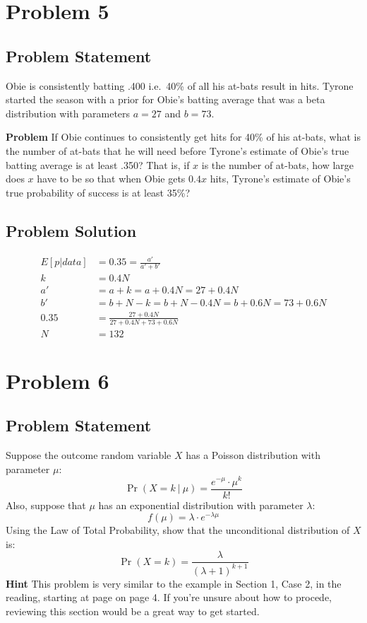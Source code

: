 \documentclass[12pt]{article}
\theoremstyle{definition}
\begin{document}
\newpage
\section*{Problem 5}

\subsection*{Problem Statement}

Obie is consistently batting .400 i.e.\ 40\% of all his at-bats result in hits. Tyrone started the season with a prior for Obie's batting average that was a beta distribution with parameters $a = 27$ and $b = 73$.

\bigskip
\noindent
{\bf Problem} If Obie continues to consistently get hits for 40\% of his at-bats, what is the number of at-bats that he will need before Tyrone's estimate of Obie's true batting average is at least .350? That is, if $x$ is the number of at-bats, how large does $x$ have to be so that when Obie gets $0.4x$ hits, Tyrone's estimate of Obie's true probability of success is at least 35\%?


\subsection*{Problem Solution}
\begin{align*}
E[p|data] &= 0.35 = \frac{a'}{a' + b'}\\
k &= 0.4N\\
a' &= a + k = a + 0.4N = 27 + 0.4N\\
b' &= b + N - k = b + N - 0.4N = b + 0.6N = 73 + 0.6N\\
0.35 &= \frac{27 + 0.4N}{27 + 0.4N + 73 + 0.6N}\\
N &= 132
\end{align*}



\newpage
\section*{Problem 6}

\subsection*{Problem Statement}

Suppose the outcome random variable $X$ has a Poisson distribution with parameter $\mu$:
$$
\Pr(X = k\ |\ \mu) = \frac{ e^{-\mu} \cdot \mu^k}{k!}
$$
Also, suppose that $\mu$ has an exponential distribution with parameter $\lambda$:
$$
f(\mu) = \lambda \cdot e^{-\lambda \mu}
$$
Using the Law of Total Probability, show that the unconditional distribution of $X$ is:
$$
\Pr( X = k ) = \frac{ \lambda }{(\lambda + 1)^{k+1}}
$$
{\bf Hint} This problem is very similar to the example in Section 1, Case 2, in the reading, starting at page on page 4. If you're unsure about how to procede, reviewing this section would be a great way to get started.
\end{document}
